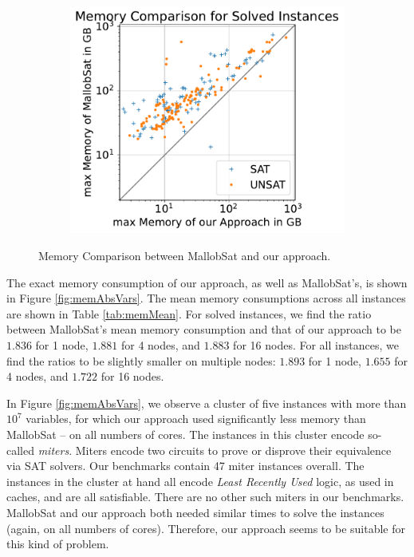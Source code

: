 \documentclass[12pt,a4paper,twoside]{scrartcl}
\numberwithin{equation}{section}
\begin{document}
\begin{figure}[!h]
\begin{subfigure}[c]{.45\textwidth}
  \end{subfigure}
  \begin{subfigure}[c]{.45\textwidth}
    \center
    \includegraphics[scale=.45]{plots/square_mem_compare/square_mem_16node.pdf}
    \label{fig:memCompare16node}
  \end{subfigure}
  \caption{Memory Comparison between MallobSat and our approach.}
  \label{fig:memCompare}
\end{figure}

The exact memory consumption of our approach, as well as MallobSat's, is shown in Figure \ref{fig:memAbsVars}. The mean memory consumptions across all instances are shown in Table \ref{tab:memMean}. For solved instances, we find the ratio between MallobSat's mean memory consumption and that of our approach to be $1.836$ for 1 node, $1.881$ for 4 nodes, and $1.883$ for 16 nodes. For all instances, we find the ratios to be slightly smaller on multiple nodes: $1.893$ for 1 node, $1.655$ for 4 nodes, and $1.722$ for 16 nodes.

In Figure \ref{fig:memAbsVars}, we observe a cluster of five instances with more than $10^7$ variables, for which our approach used significantly less memory than MallobSat -- on all numbers of cores. The instances in this cluster encode so-called \textit{miters}. Miters encode two circuits to prove or disprove their equivalence via SAT solvers. Our benchmarks contain 47 miter instances overall. The instances in the cluster at hand all encode \textit{Least Recently Used} logic, as used in caches, and are all satisfiable. There are no other such miters in our benchmarks. MallobSat and our approach both needed similar times to solve the instances (again, on all numbers of cores). Therefore, our approach seems to be suitable for this kind of problem.
\end{document}
